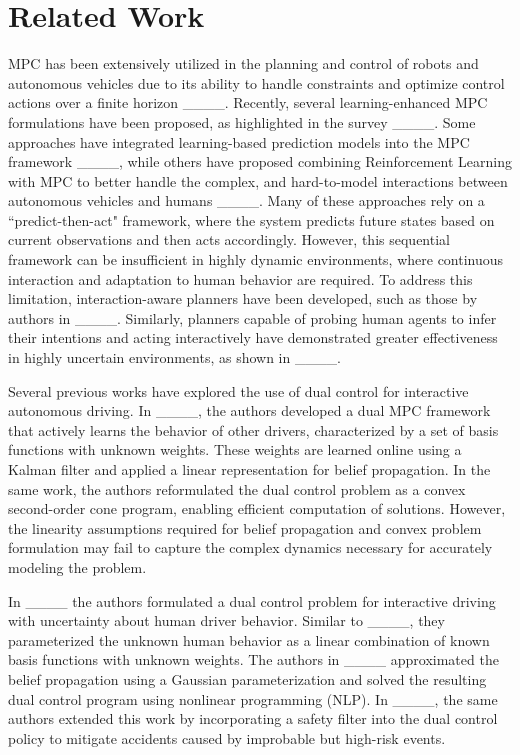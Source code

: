 \section{Related Work}
MPC has been extensively utilized in the planning and control of robots and autonomous vehicles due to its ability to handle constraints and optimize control actions over a finite horizon ____. Recently, several learning-enhanced MPC formulations have been proposed, as highlighted in the survey ____. Some approaches have integrated learning-based prediction models into the MPC framework ____, while others have proposed combining Reinforcement Learning with MPC to better handle the complex, and hard-to-model interactions between autonomous vehicles and humans ____. Many of these approaches rely on a ``predict-then-act" framework, where the system predicts future states based on current observations and then acts accordingly. However,  this sequential framework can be insufficient in highly dynamic environments, where continuous interaction and adaptation to human behavior are required. To address this limitation, interaction-aware planners have been developed, such as those by authors in ____. Similarly, planners capable of probing human agents to infer their intentions and acting interactively have demonstrated greater effectiveness in highly uncertain environments, as shown in ____. %

 
Several previous works have explored the use of dual control for interactive autonomous driving.
In ____, the authors developed a dual MPC framework that actively learns the behavior of other drivers, characterized by a set of basis functions with unknown weights. 
These weights are learned online using a Kalman filter and applied a linear representation for belief propagation.
In the same work, the authors reformulated the dual control problem as a convex second-order cone program, enabling efficient computation of solutions.
However, the linearity assumptions required for belief propagation and convex problem formulation may fail to capture the complex dynamics necessary for accurately modeling the problem.

In ____ the authors formulated a dual control problem for interactive driving with uncertainty about human driver behavior.
Similar to ____, they parameterized the unknown human behavior as a linear combination of known basis functions with unknown weights.
The authors in ____ approximated the belief propagation using a Gaussian parameterization and solved the resulting dual control program using nonlinear programming (NLP). In ____, the same authors extended this work by incorporating a safety filter into the dual control policy to mitigate accidents caused by improbable but high-risk events.

